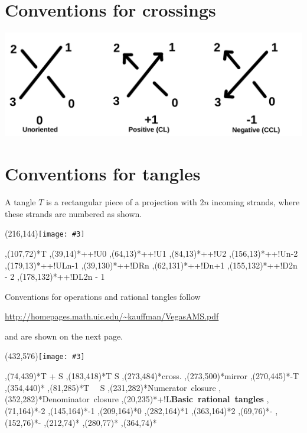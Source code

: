 \documentclass[12pt]{article}
\newenvironment{xyoverpic}[3]
{%
\begin{xy}
\xyimport#1{\texttt{[image: \#3]}}
}{\end{xy}}
\newenvironment{cxyoverpic}[3]
{%
\begin{center}
\centering\leavevmode\large
\begin{xyoverpic}{#1}{#2}{#3}
}{\end{xyoverpic}
\end{center}}
\begin{document}
\section{Conventions for crossings}\label{sec:cross}

\includegraphics[scale=0.6]{pics/crossings}



\section{Conventions for tangles}

A tangle $T$ is a rectangular piece of a projection with $2n$ incoming
strands, where these strands are numbered as shown.

\begin{cxyoverpic}{(216,144)}{scale=1.0}{pics/tangle}
    ,(107,72)*{T}
    ,(39,14)*++!U{0}
    ,(64,13)*++!U{1}
    ,(84,13)*++!U{2}
    ,(156,13)*++!U{n-2}
    ,(179,13)*++!UL{n-1}
    ,(39,130)*++!DR{n}
    ,(62,131)*++!D{n+1}
    ,(155,132)*++!D{2n - 2}
    ,(178,132)*++!DL{2n - 1}
\end{cxyoverpic}


Conventions for operations and rational tangles follow

 \url{http://homepages.math.uic.edu/~kauffman/VegasAMS.pdf}

 and are shown on the next page.

\pagebreak 

\begin{cxyoverpic}{(432,576)}{scale=1.0}{pics/tangles}
    ,(74,439)*{T + S}
    ,(183,418)*{T \ast S}
    ,(273,484)*{\mbox{\scriptsize cross.}}
    ,(273,500)*{\mbox{\scriptsize mirror}}
    ,(270,445)*{-T}
    ,(354,440)*{\displaystyle{}}
    ,(81,285)*{T \, \big\vert \, S}
    ,(231,282)*{\mbox{\normalsize Numerator closure}}
    ,(352,282)*{\mbox{\normalsize Denominator closure}}
    ,(20,235)*+!L{\mbox{\textbf{Basic rational tangles}}}
    ,(71,164)*{-2}
    ,(145,164)*{-1}
    ,(209,164)*{0}
    ,(282,164)*{1}
    ,(363,164)*{2}
    ,(69,76)*{\displaystyle -}
    ,(152,76)*{\displaystyle-}
    ,(212,74)*{\infty}
    ,(280,77)*{\displaystyle{}}
    ,(364,74)*{\displaystyle{}}
\end{cxyoverpic}
\end{document}
